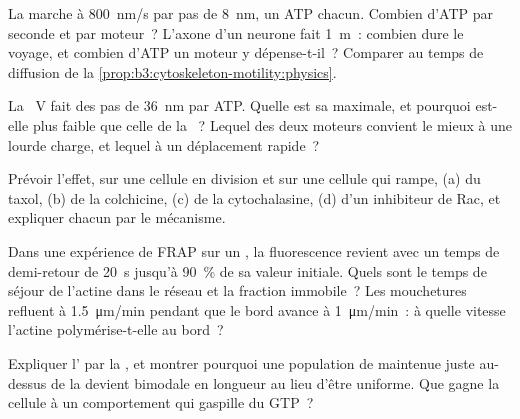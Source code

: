 \begin{exercise}[$\star\star$]\label{exo:b3:cytoskeleton-motility:6}
La  marche à \qty{800}{nm/s} par pas de \qty{8}{nm}, un ATP
chacun. Combien d'ATP par seconde et par moteur~? L'axone d'un neurone
fait \qty{1}{m}~: combien dure le voyage, et combien d'ATP un moteur y
dépense-t-il~? Comparer au temps de diffusion de la
\cref{prop:b3:cytoskeleton-motility:physics}.
\end{exercise}

\begin{exercise}[$\star\star$]\label{exo:b3:cytoskeleton-motility:7}
La ~V fait des pas de \qty{36}{nm} par ATP. Quelle est sa  maximale, et pourquoi est-elle plus faible que celle de la
~? Lequel des deux moteurs convient le mieux à une lourde
charge, et lequel à un déplacement rapide~?
\end{exercise}

\begin{exercise}[$\star\star$]\label{exo:b3:cytoskeleton-motility:8}
Prévoir l'effet, sur une cellule en division et sur une cellule qui
rampe, (a) du taxol, (b) de la colchicine, (c) de la cytochalasine,
(d) d'un inhibiteur de Rac, et expliquer chacun par le mécanisme.
\end{exercise}

\begin{exercise}[$\star\star$]\label{exo:b3:cytoskeleton-motility:9}
Dans une expérience de FRAP sur un , la fluorescence revient
avec un temps de demi-retour de \qty{20}{s} jusqu'à \qty{90}{\%} de sa
valeur initiale. Quels sont le temps de séjour de l'actine dans le
réseau et la fraction immobile~? Les mouchetures refluent à
\qty{1.5}{\micro m/min} pendant que le bord avance à
\qty{1}{\micro m/min}~: à quelle vitesse l'actine polymérise-t-elle au
bord~?
\end{exercise}

\begin{exercise}[$\star\star\star$]\label{exo:b3:cytoskeleton-motility:10}
Expliquer l' par la , et montrer
pourquoi une population de  maintenue juste au-dessus de la
 devient bimodale en longueur au lieu d'être
uniforme. Que gagne la cellule à un comportement qui gaspille du GTP~?
\end{exercise}


